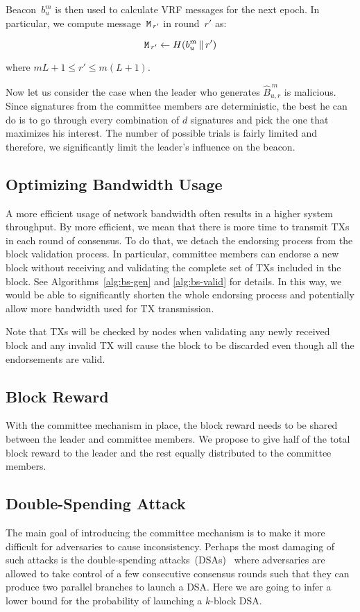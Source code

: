 \documentclass{article}
\begin{document}
Beacon~$b_u^m$ is then used to calculate VRF messages for the next epoch. In particular, we compute message~${\tt M}_{\,r'}$ in round~$r'$ as:

\begin{equation}
    {\tt M}_{\,r'} \leftarrow H(b_u^m\,\|\,r')
\end{equation}

where $mL+1\leq r'\leq m(L+1)$.

Now let us consider the case when the leader who generates $\hat{B}_{u,r}^{\,m}$ is malicious. Since signatures from the committee members are deterministic, the best he can do is to go through every combination of $d$ signatures and pick the one that maximizes his interest. The number of possible trials is fairly limited and therefore, we significantly limit the leader's influence on the beacon.

\subsection{Optimizing Bandwidth Usage}
A more efficient usage of network bandwidth often results in a higher system throughput. By more efficient, we mean that there is more time to transmit TXs in each round of consensus. To do that, we detach the endorsing process from the block validation process. In particular, committee members can endorse a new block without receiving and validating the complete set of TXs included in the block. See Algorithms~\ref{alg:bs-gen} and \ref{alg:bs-valid} for details. In this way, we would be able to significantly shorten the whole endorsing process and potentially allow more bandwidth used for TX transmission. 

Note that TXs will be checked by nodes when validating any newly received block and any invalid TX will cause the block to be discarded even though all the endorsements are valid. 

\subsection{Block Reward}
With the committee mechanism in place, the block reward needs to be shared between the leader and committee members. We propose to give half of the total block reward to the leader and the rest equally distributed to the committee members.

\subsection{Double-Spending Attack}
The main goal of introducing the committee mechanism is to make it more difficult for adversaries to cause inconsistency. Perhaps the most damaging of such attacks is the double-spending attacks~(DSAs)~\cite{Sat08} where adversaries are allowed to take control of a few consecutive consensus rounds such that they can produce two parallel branches to launch a DSA. Here we are going to infer a lower bound for the probability of launching a $k$-block DSA. 
\end{document}

